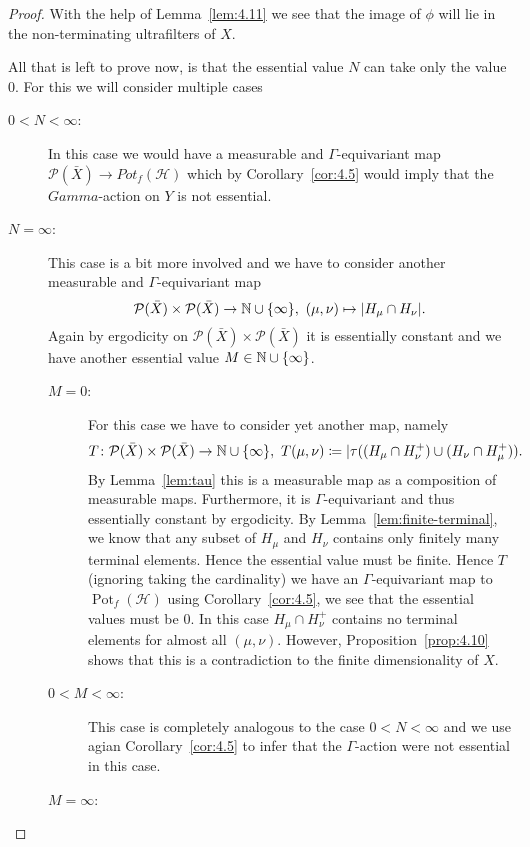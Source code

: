 \begin{proof}
  With the help of Lemma~\ref{lem:4.11} we see that the image of \(\phi\) will lie in the non-terminating ultrafilters of \(X\).

  All that is left to prove now, is that the essential value \(N\) can take only the value \(0\). For this we will consider multiple cases
  \begin{description}
  \item[\(0 < N < \infty\):] In this case we would have a measurable and \(\Gamma\)-equivariant map \(\mathcal{P}(\bar X) \to Pot_f(\mathcal{H})\) which by Corollary~\ref{cor:4.5} would imply that the \(Gamma\)-action on \(Y\) is not essential.
  \item[\(N = \infty\):] This case is a bit more involved and we have to consider another measurable and \(\Gamma\)-equivariant map
    \[
      \mathcal{P}(\bar X) \times \mathcal{P}(\bar X) \to \mathbb{N} \cup \{\infty\},\ (\mu, \nu) \mapsto |H_\mu \cap H_\nu|.
    \]
    Again by ergodicity on \(\mathcal{P}(\bar X) \times \mathcal{P}(\bar X)\) it is essentially constant and we have another essential value \(M \in \mathbb{N} \cup \{\infty\}\).
    \begin{description}
    \item[\(M = 0\):] For this case we have to consider yet another map, namely
      \[
        T\colon \mathcal{P}(\bar X) \times \mathcal{P}(\bar X) \to \mathbb{N} \cup \{\infty\},\ T(\mu, \nu) \coloneqq |\tau((H_\mu \cap H_\nu^+) \cup (H_\nu \cap H_\mu^+)).
      \]
      By Lemma~\ref{lem:tau} this is a measurable map as a composition of measurable maps. Furthermore, it is \(\Gamma\)-equivariant and thus essentially constant by ergodicity. By Lemma~\ref{lem:finite-terminal}, we know that any subset of \(H_\mu\) and \(H_\nu\) contains only finitely many terminal elements. Hence the essential value must be finite. Hence \(T\) (ignoring taking the cardinality) we have an \(\Gamma\)-equivariant map to \(\operatorname{Pot}_f(\mathcal{H})\) using Corollary~\ref{cor:4.5}, we see that the essential values must be 0. In this case \(H_\mu \cap H_\nu^+\) contains no terminal elements for almost all \((\mu, \nu)\). However, Proposition~\ref{prop:4.10} shows that this is a contradiction to the finite dimensionality of \(X\).
    \item[\(0 < M < \infty\):] This case is completely analogous to the case \(0 < N < \infty\) and we use agian Corollary~\ref{cor:4.5} to infer that the \(\Gamma\)-action were not essential in this case. 
    \item[\(M = \infty\):] 
    \end{description}
  \end{description}

\end{proof}


